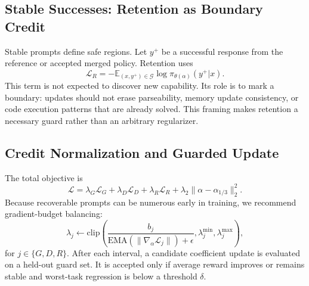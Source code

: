\documentclass[11pt]{article}
\begin{document}
\subsection{Stable Successes: Retention as Boundary Credit}

Stable prompts define safe regions.  Let $y^+$ be a successful response from the reference or accepted merged policy.  Retention uses
\begin{equation}
    \mathcal{L}_{R}= -\mathbb{E}_{(x,y^+)\in\mathcal{G}}\log \pi_{\theta(\alpha)}(y^+|x).
\end{equation}
This term is not expected to discover new capability.  Its role is to mark a boundary: updates should not erase parseability, memory update consistency, or code execution patterns that are already solved.  This framing makes retention a necessary guard rather than an arbitrary regularizer.

\subsection{Credit Normalization and Guarded Update}

The total objective is
\begin{equation}
    \mathcal{L}=\lambda_G\mathcal{L}_{G}+\lambda_D\mathcal{L}_{D}+\lambda_R\mathcal{L}_{R}+\lambda_2\|\alpha-\alpha_{1/3}\|_2^2.
\end{equation}
Because recoverable prompts can be numerous early in training, we recommend gradient-budget balancing:
\begin{equation}
    \lambda_j\leftarrow\mathrm{clip}\left(\frac{b_j}{\mathrm{EMA}(\|\nabla_\alpha\mathcal{L}_j\|)+\epsilon},\lambda_j^{\min},\lambda_j^{\max}\right),
\end{equation}
for $j\in\{G,D,R\}$.  After each interval, a candidate coefficient update is evaluated on a held-out guard set.  It is accepted only if average reward improves or remains stable and worst-task regression is below a threshold $\delta$.

\begin{table}[t]
\centering
\small
\setlength{\tabcolsep}{3pt}
\caption{Core method as an evidence-to-objective map.  This table should remain central in the final paper: it makes the loss design look inevitable rather than heuristic.}
\label{tab:evidence-map}
\end{table}
\end{document}

